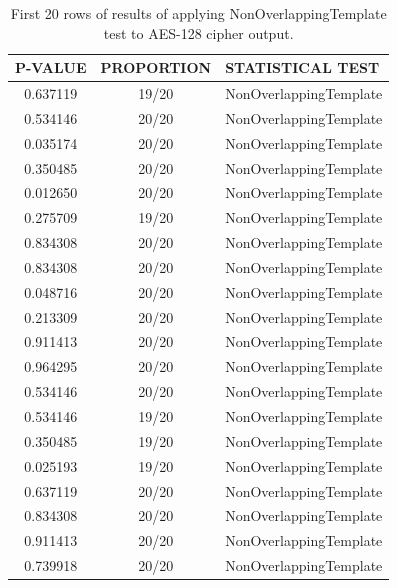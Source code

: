 \documentclass[conference]{IEEEtran}
\begin{document}
\begin{center}
\begin{table}[H]
\renewcommand{\arraystretch}{1.5}
\centering
\begin{tabular}{|c|c|l|}
\hline
\textbf{P-VALUE} & \textbf{PROPORTION} & \textbf{STATISTICAL TEST} \\ \hline
0.637119         & 19/20               & NonOverlappingTemplate    \\ \hline
0.534146         & 20/20               & NonOverlappingTemplate    \\ \hline
0.035174         & 20/20               & NonOverlappingTemplate    \\ \hline
0.350485         & 20/20               & NonOverlappingTemplate    \\ \hline
0.012650         & 20/20               & NonOverlappingTemplate    \\ \hline
0.275709         & 19/20               & NonOverlappingTemplate    \\ \hline
0.834308         & 20/20               & NonOverlappingTemplate    \\ \hline
0.834308         & 20/20               & NonOverlappingTemplate    \\ \hline
0.048716         & 20/20               & NonOverlappingTemplate    \\ \hline
0.213309         & 20/20               & NonOverlappingTemplate    \\ \hline
0.911413         & 20/20               & NonOverlappingTemplate    \\ \hline
0.964295         & 20/20               & NonOverlappingTemplate    \\ \hline
0.534146         & 20/20               & NonOverlappingTemplate    \\ \hline
0.534146         & 19/20               & NonOverlappingTemplate    \\ \hline
0.350485         & 19/20               & NonOverlappingTemplate    \\ \hline
0.025193         & 19/20               & NonOverlappingTemplate    \\ \hline
0.637119         & 20/20               & NonOverlappingTemplate    \\ \hline
0.834308         & 20/20               & NonOverlappingTemplate    \\ \hline
0.911413         & 20/20               & NonOverlappingTemplate    \\ \hline
0.739918         & 20/20               & NonOverlappingTemplate    \\ \hline
\end{tabular}
\caption{First 20 rows of results of applying NonOverlappingTemplate test to AES-128 cipher output.}
\label{nistresults1}
\end{table}
\end{center}
\end{document}

